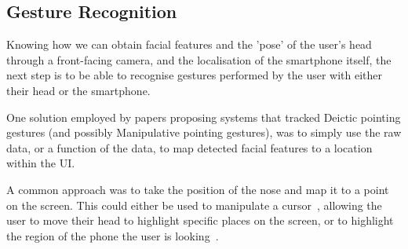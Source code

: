 \subsection{Gesture Recognition}
Knowing how we can obtain facial features and the 'pose' of the user's head through a front-facing camera, and the localisation of the smartphone itself, the next step is to be able to recognise gestures performed by the user with either their head or the smartphone.

One solution employed by papers proposing systems that tracked Deictic pointing gestures (and possibly Manipulative pointing gestures), was to simply use the raw data, or a function of the data, to map detected facial features to a location within the UI.

A common approach was to take the position of the nose and map it to a point on the screen. This could either be used to manipulate a cursor~\cite{gorodnichy2004nouse, varona2008hands, onuki2016combined}, allowing the user to move their head to highlight specific places on the screen, or to highlight the region of the phone the user is looking~\cite{hueber2020headbang,voelker2020headreach,roig2015face}.

